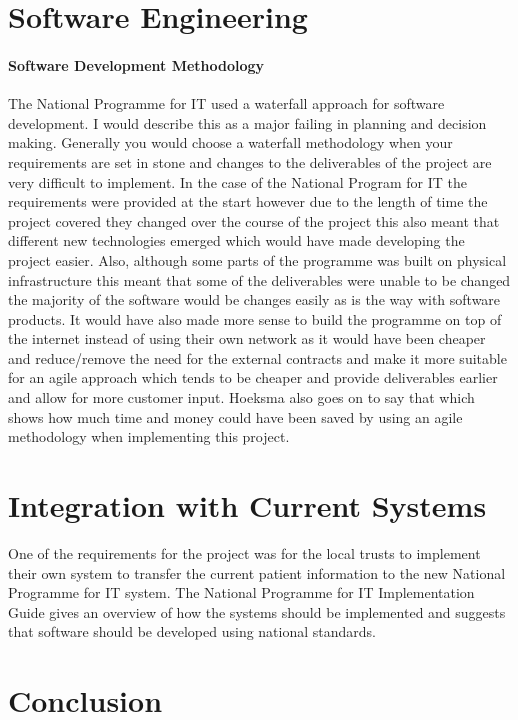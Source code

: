 \documentclass[a4paper,12pt]{scrartcl}
\begin{document}
	\section{Software Engineering}
	{
		\paragraph{Software Development Methodology}
		{
			\label{par:softwareDevelopmentMethodology}
			The National Programme for IT used a waterfall approach for software development\cite{Hoeksma2013}. I would describe this as a major failing in planning and decision making. Generally you would choose a waterfall methodology when your requirements are set in stone and changes to the deliverables of the project are very difficult to implement. In the case of the National Program for IT the requirements were provided at the start however due to the length of time the project covered they changed over the course of the project this also meant that different new technologies emerged which would have made developing the project easier. Also, although some parts of the programme was built on physical infrastructure this meant that some of the deliverables were unable to be changed the majority of the software would be changes easily as is the way with software products. It would have also made more sense to build the programme on top of the internet instead of using their own network as it would have been cheaper and reduce/remove the need for the external contracts and make it more suitable for an agile approach which tends to be cheaper and provide deliverables earlier and allow for more customer input. Hoeksma also goes on to say that \cite{Hoeksma2013} which shows how much time and money could have been saved by using an agile methodology when implementing this project.
		}
	}
	\section{Integration with Current Systems}
	{
		One of the requirements for the project was for the local trusts to implement their own system to transfer the current patient information to the new National Programme for IT system. The National Programme for IT Implementation Guide\cite{HealthImplementationGuidanceteam2007} gives an overview of how the systems should be implemented and suggests that software should be developed using national standards.
	}
	\section{Conclusion}
	{

	}
	
	
	\newpage
	
	\printbibliography[heading=bibintoc,title=References]
\end{document}
